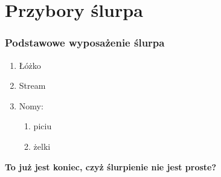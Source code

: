 \documentclass[12pt]{beamer}
\begin{document}
\section{Przybory ślurpa}
\begin{frame}
    \frametitle{Podstawowe wyposażenie ślurpa}
    \begin{enumerate}
        \item<1-> Łóżko
        \item<2-> Stream
        \item<3-> Nomy:
            \begin{enumerate}
                \item piciu
                \item żelki
            \end{enumerate}
    \end{enumerate}
\end{frame}

\begin{frame}
\textbf{To już jest koniec, czyż ślurpienie nie jest proste?}
\end{frame}
\end{document}
